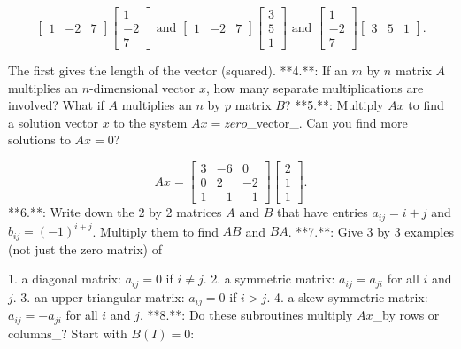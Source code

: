 \[\begin{bmatrix}1&-2&7\end{bmatrix}\begin{bmatrix}1\\ -2\\ 7\end{bmatrix}\text{ and }\begin{bmatrix}1&-2&7\end{bmatrix}\begin{bmatrix}3\\ 5\\ 1\end{bmatrix}\text{ and }\begin{bmatrix}1\\ -2\\ 7\end{bmatrix}\begin{bmatrix}3&5&1\end{bmatrix}.\]

The first gives the length of the vector (squared).
**4.**: If an \(m\) by \(n\) matrix \(A\) multiplies an \(n\)-dimensional vector \(x\), how many separate multiplications are involved? What if \(A\) multiplies an \(n\) by \(p\) matrix \(B\)?
**5.**: Multiply \(Ax\) to find a solution vector \(x\) to the system \(Ax=zero\)_vector_. Can you find more solutions to \(Ax=0\)?

\[Ax=\begin{bmatrix}3&-6&0\\ 0&2&-2\\ 1&-1&-1\end{bmatrix}\begin{bmatrix}2\\ 1\\ 1\end{bmatrix}.\]
**6.**: Write down the 2 by 2 matrices \(A\) and \(B\) that have entries \(a_{ij}=i+j\) and \(b_{ij}=(-1)^{i+j}\). Multiply them to find \(AB\) and \(BA\).
**7.**: Give 3 by 3 examples (not just the zero matrix) of

1. a diagonal matrix: \(a_{ij}=0\) if \(i\neq j\).
2. a symmetric matrix: \(a_{ij}=a_{ji}\) for all \(i\) and \(j\).
3. an upper triangular matrix: \(a_{ij}=0\) if \(i>j\).
4. a skew-symmetric matrix: \(a_{ij}=-a_{ji}\) for all \(i\) and \(j\).
**8.**: Do these subroutines multiply \(Ax\)_by rows or columns_? Start with \(B(I)=0\):